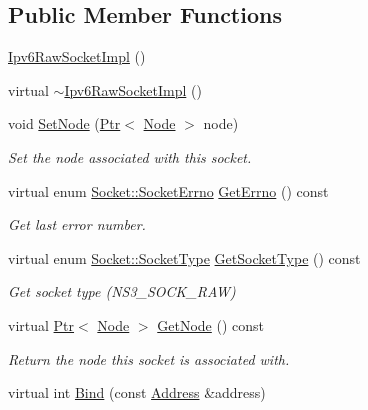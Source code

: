 \subsection*{Public Member Functions}
\begin{DoxyCompactItemize}
\item 
\hyperlink{classns3_1_1Ipv6RawSocketImpl_aa3ee357e602db12a279eb34ba2968391}{Ipv6\+Raw\+Socket\+Impl} ()
\item 
virtual \hyperlink{classns3_1_1Ipv6RawSocketImpl_ac481e99e425628799233db0a0fbfcef4}{$\sim$\+Ipv6\+Raw\+Socket\+Impl} ()
\item 
void \hyperlink{classns3_1_1Ipv6RawSocketImpl_a227c78fa2bf8af76f79bf8c8f8e84c71}{Set\+Node} (\hyperlink{classns3_1_1Ptr}{Ptr}$<$ \hyperlink{classns3_1_1Node}{Node} $>$ node)
\begin{DoxyCompactList}\small\item\em Set the node associated with this socket. \end{DoxyCompactList}\item 
virtual enum \hyperlink{classns3_1_1Socket_ada1328c5ae0c28cb2a982caf8f6d6cca}{Socket\+::\+Socket\+Errno} \hyperlink{classns3_1_1Ipv6RawSocketImpl_a0e89d09b36d374f55ff7942a1d87a8ca}{Get\+Errno} () const 
\begin{DoxyCompactList}\small\item\em Get last error number. \end{DoxyCompactList}\item 
virtual enum \hyperlink{classns3_1_1Socket_a698fbcc486a48b7a0d2b0e4ab863d571}{Socket\+::\+Socket\+Type} \hyperlink{classns3_1_1Ipv6RawSocketImpl_ac44d22012dfc6959efd11f1688ac15bd}{Get\+Socket\+Type} () const 
\begin{DoxyCompactList}\small\item\em Get socket type (N\+S3\+\_\+\+S\+O\+C\+K\+\_\+\+R\+AW) \end{DoxyCompactList}\item 
virtual \hyperlink{classns3_1_1Ptr}{Ptr}$<$ \hyperlink{classns3_1_1Node}{Node} $>$ \hyperlink{classns3_1_1Ipv6RawSocketImpl_a0e1459bc9485933deba1135dc70d7d6f}{Get\+Node} () const 
\begin{DoxyCompactList}\small\item\em Return the node this socket is associated with. \end{DoxyCompactList}\item 
virtual int \hyperlink{classns3_1_1Ipv6RawSocketImpl_a3c6150fb423e1a88bc12a9a1f0fa7243}{Bind} (const \hyperlink{classns3_1_1Address}{Address} \&address)

\end{DoxyCompactItemize}

